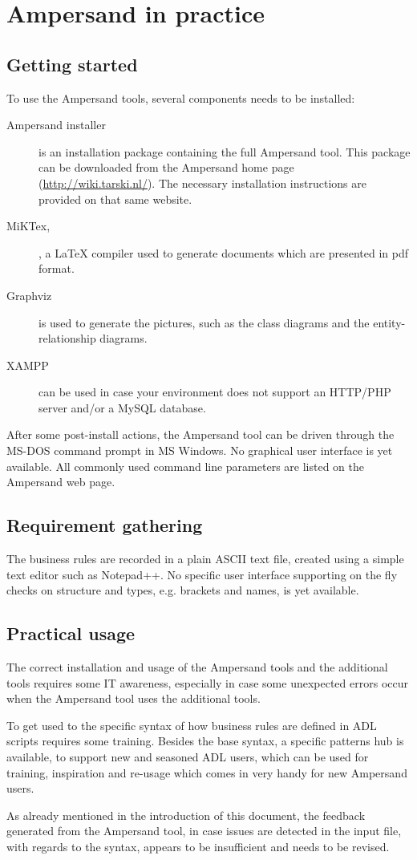 
\section{Ampersand in practice}
\label{sec:InPractice}

\subsection{Getting started}
To use the Ampersand tools, several components needs to be installed:
\begin{description}
	\item[Ampersand installer] is an installation package containing the full Ampersand tool. This package can be downloaded from the Ampersand home page (\url{http://wiki.tarski.nl/}). The necessary installation instructions are provided on that same website.
	\item[MiKTex,], a LaTeX compiler used to generate documents which are presented in pdf format.
	\item[Graphviz] is used to generate the pictures, such as the class diagrams and the entity-relationship diagrams. 
	\item[XAMPP] can be used in case your environment does not support an HTTP/PHP server and/or a MySQL database.
\end{description}

\noindent
After some post-install actions, the Ampersand tool can be driven through the MS-DOS command prompt in MS Windows. 
No graphical user interface is yet available. All commonly used command line parameters are listed on the Ampersand web page.

\subsection{Requirement gathering}
The business rules are recorded in a plain ASCII text file, created using a simple text editor such as Notepad++.
No specific user interface supporting on the fly checks on structure and types, e.g. brackets and names, is yet available.

\subsection{Practical usage}
The correct installation and usage of the Ampersand tools and the additional tools requires some IT awareness, especially in case some unexpected errors occur when the Ampersand tool uses the additional tools. 

To get used to the specific syntax of how business rules are defined in ADL scripts requires some training. 
Besides the base syntax, a specific patterns hub is available, to support new and seasoned ADL users,  which can be used for training, inspiration and re-usage which comes in very handy for new Ampersand users.

As already mentioned in the introduction of this document, the feedback generated from the Ampersand tool, in case  issues are detected in the input file, with regards to the syntax, appears to be insufficient and needs to be revised.